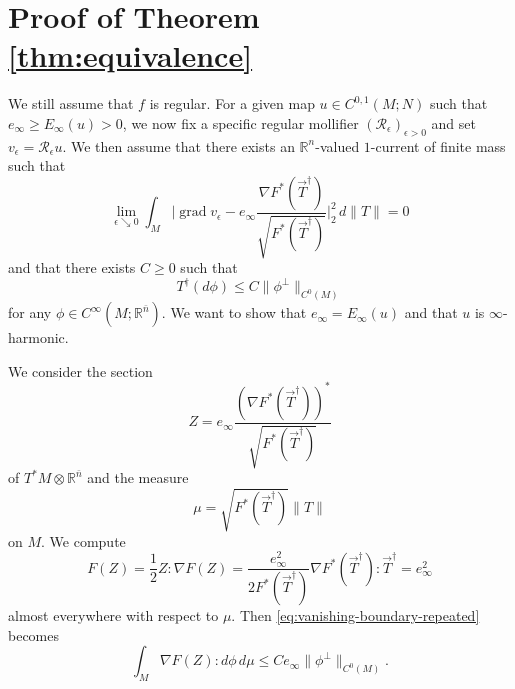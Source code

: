 \documentclass[a4paper]{article}
\newcommand{\R}{\mathbb{R}}
\newcommand{\ndim}{{\bar{n}}}
\DeclareMathOperator{\grad}{grad}
\theoremstyle{definition}
\theoremstyle{remark}
\begin{document}
\section{Proof of Theorem \ref{thm:equivalence}} \label{sct:equivalence}

We still assume that $f$ is regular.
For a given map $u \in C^{0, 1}(M; N)$ such that $e_\infty \ge E_\infty(u) > 0$, we now fix a specific regular mollifier $(\mathcal{R}_\epsilon)_{\epsilon >0}$ and
set $v_\epsilon = \mathcal{R}_\epsilon u$. We then assume that there exists an $\R^n$-valued $1$-current of finite mass such that
\begin{equation} \label{eq:convergence-gradient}
\lim_{\epsilon \searrow 0} \int_M \biggl|\grad v_\epsilon - e_\infty \frac{\nabla F^*(\vec{T}^\dagger)}{\sqrt{F^*(\vec{T}^\dagger)}}\biggr|_2^2 \, d\|T\| = 0
\end{equation}
and that there exists $C \ge 0$ such that
\begin{equation} \label{eq:vanishing-boundary-repeated}
T^\dagger(d\phi) \le C \|\phi^\perp\|_{C^0(M)}
\end{equation}
for any $\phi \in C^\infty(M; \R^\ndim)$. We want to show that $e_\infty = E_\infty(u)$ and that
$u$ is $\infty$-harmonic.

We consider the section
\[
Z = e_\infty \frac{(\nabla F^*(\vec{T}^\dagger))^*}{\sqrt{F^*(\vec{T}^\dagger)}}
\]
of $T^*M \otimes \R^\ndim$ and the measure
\[
\mu = \sqrt{F^*(\vec{T}^\dagger)} \|T\|
\]
on $M$. We compute
\[
F(Z) = \frac{1}{2} Z : \nabla F(Z) = \frac{e_\infty^2}{2 F^*(\vec{T}^\dagger)} \nabla F^*(\vec{T}^\dagger) : \vec{T}^\dagger = e_\infty^2
\]
almost everywhere with respect to $\mu$. Then \eqref{eq:vanishing-boundary-repeated} becomes
\[
\int_M \nabla F(Z) : d\phi \, d\mu \le Ce_\infty \|\phi^\perp\|_{C^0(M)}.
\]
\end{document}
